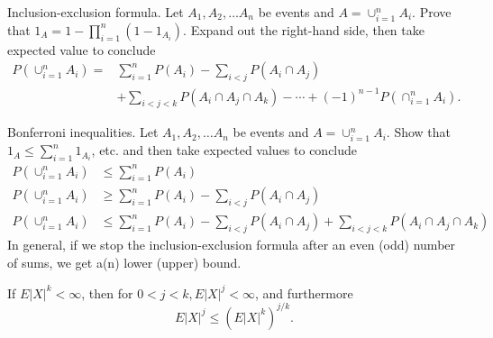 \documentclass[en, normal, 11pt, black]{elegantnote}
\newenvironment{exercise}[1]{\begin{tcolorbox}[colback=black!15, colframe=black!80, title=#1]}{\end{tcolorbox}}
\begin{document}
    \begin{exercise}{1.6.9.}
        Inclusion-exclusion formula. Let $A_{1}, A_{2}, \ldots A_{n}$ be events and $A=\cup_{i=1}^{n} A_{i} .$ Prove that $1_{A}=1-\prod_{i=1}^{n}\left(1-1_{A_{i}}\right)$. Expand out the right-hand side, then take expected value to conclude
        $$
        \begin{aligned}
        P\left(\cup_{i=1}^{n} A_{i}\right)=& \sum_{i=1}^{n} P\left(A_{i}\right)-\sum_{i<j} P\left(A_{i} \cap A_{j}\right) \\
        &+\sum_{i<j<k} P\left(A_{i} \cap A_{j} \cap A_{k}\right)-\cdots+(-1)^{n-1} P\left(\cap_{i=1}^{n} A_{i}\right). 
        \end{aligned}
        $$
    \end{exercise}
    \begin{exercise}{1.6.10.}
        Bonferroni inequalities. Let $A_{1}, A_{2}, \ldots A_{n}$ be events and $A=\cup_{i=1}^{n} A_{i} .$ Show that $1_{A} \leq \sum_{i=1}^{n} 1_{A_{i}}$, etc. and then take expected values to conclude
        $$
        \begin{aligned}
        P\left(\cup_{i=1}^{n} A_{i}\right) & \leq \sum_{i=1}^{n} P\left(A_{i}\right) \\
        P\left(\cup_{i=1}^{n} A_{i}\right) & \geq \sum_{i=1}^{n} P\left(A_{i}\right)-\sum_{i<j} P\left(A_{i} \cap A_{j}\right) \\
        P\left(\cup_{i=1}^{n} A_{i}\right) & \leq \sum_{i=1}^{n} P\left(A_{i}\right)-\sum_{i<j} P\left(A_{i} \cap A_{j}\right)+\sum_{i<j<k} P\left(A_{i} \cap A_{j} \cap A_{k}\right)
        \end{aligned}
        $$
        In general, if we stop the inclusion-exclusion formula after an even (odd) number of sums, we get a(n) lower (upper) bound. 
    \end{exercise}
    \begin{exercise}{1.6.11.}
        If $E|X|^{k}<\infty$, then for $0<j<k, E|X|^{j}<\infty$, and furthermore
        $$
        E|X|^{j} \leq\left(E|X|^{k}\right)^{j / k}. 
        $$
    \end{exercise}
\end{document}
